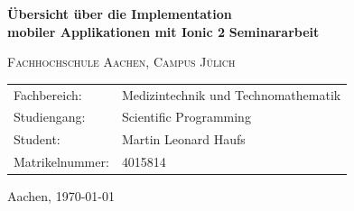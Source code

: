 \begin{titlepage}
	\begin{flushright}
		\textbf{\Large Übersicht über die Implementation\\
		               mobiler Applikationen mit Ionic 2}
		\linebreak
		\linebreak
		\textbf{\Large Seminararbeit}
		\linebreak
		\linebreak
	\end{flushright}
	\vfill
	\raggedright\textsc{Fachhochschule Aachen, Campus Jülich}\linebreak%
	\begin{tabular*}{\linewidth}{ll}
		Fachbereich: & Medizintechnik und Technomathematik\\
		Studiengang: & Scientific Programming\\
		Student: & Martin Leonard Haufs\\ 
		Matrikelnummer: & 4015814
	\end{tabular*}
	\vfill	
	\centering\large Aachen, \today
\end{titlepage}